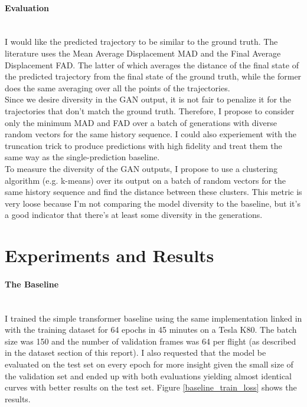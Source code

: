 \documentclass{article}
\begin{document}
\paragraph{Evaluation}$ $
\\I would like the predicted trajectory to be similar to the ground truth. The literature \cite{giuliari2020transformer} uses the Mean Average Displacement MAD and the Final Average Displacement FAD. The latter of which averages the distance of the final state of the predicted trajectory from the final state of the ground truth, while the former does the same averaging over all the points of the trajectories. 
\\Since we desire diversity in the GAN output, it is not fair to penalize it for the trajectories that don't match the ground truth. Therefore, I propose to consider only the minimum MAD and FAD over a batch of generations with diverse random vectors for the same history sequence. I could also experiement with the truncation trick to produce predictions with high fidelity and treat them the same way as the single-prediction baseline.  
\\To measure the diversity of the GAN outputs, I propose to use a clustering algorithm (e.g. k-means) over its output on a batch of random vectors for the same history sequence and find the distance between these clusters.  This metric is very loose because I'm not comparing the model diversity to the baseline, but it's a good indicator that there's at least some diversity in the generations. 

\section{Experiments and Results}
\paragraph{The Baseline}$ $
\\I trained the simple transformer baseline using the same implementation linked in \cite{giuliari2020transformer} with the training dataset for 64 epochs in 45 minutes on a Tesla K80. The batch size was 150 and the number of validation frames was 64 per flight (as described in the dataset section of this report).  I also requested that the model be evaluated on the test set on every epoch for more insight given the small size of the validation set and ended up with both evaluations yielding almost identical curves with better results on the test set.  Figure \ref{baseline_train_loss} shows the results. 
\end{document}
